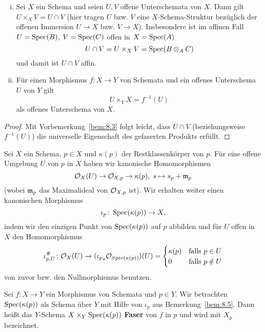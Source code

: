 \begin{bsp}
\label{bsp:8.4}
	\begin{enumerate}[i)]
		\item Sei $X$ ein Schema und seien $U,V$ offene Unterschemata von $X$. Dann gilt $U\times_X V = U \cap V$ (hier tragen $U$ bzw. $V$ eine $X$-Schema-Struktur bezüglich der offenen Immersion $U \to X$ bzw. $V\to X$). Insbesondere ist im affinen Fall $U = \operatorname{Spec}(B)$, $V=\operatorname{Spec}(C)$ offen in $X=\operatorname{Spec}(A)$
		\[
			U \cap V = U\times_X V = \operatorname{Spec}(B \otimes_A C) 	
		\]
		und damit ist $U \cap V$ affin.
		\item Für einen Morphismus $f \colon X \to Y$ von Schemata und ein offenes Unterschema $U$ von $Y$ gilt
		\[
			U \times_Y X = f^{-1}(U)
		\]
		als offenes Unterschema von $X$.
	\end{enumerate}
	\begin{proof}
		Mit Vorbemerkung~\ref{bem:8.3} folgt leicht, dass $U\cap V$ (beziehungsweise $f^{-1}(U)$) die universelle Eigenschaft des gefaserten Produkts erfüllt.
	\end{proof}
\end{bsp}

\begin{bem}
\label{bem:8.5}
	Sei $X$ ein Schema, $p \in X$ und $\kappa(p)$ der Restklassenkörper von $p$. Für eine offene Umgebung $U$ von $p$ in $X$ haben wir kanonische Homomorphismen
	\[
		\mathcal{O}_X(U) \to \mathcal{O}_{X,p} \to \kappa(p), \; s \mapsto s_p + \mathfrak{m}_p
	\]
	(wobei $\mathfrak{m}_p$ das Maximalideal von $\mathcal{O}_{X,p}$ ist).
	Wir erhalten weiter einen kanonischen Morphismus
	\[
		\iota_p\colon \operatorname{Spec}(\kappa(p))\to X,
	\]
	indem wir den einzigen Punkt von $\operatorname{Spec}(\kappa(p))$ auf $p$ abbilden und für $U$ offen in $X$ den Homomorphismus
	\[
		\iota_{p,U}^{\#} \colon \mathcal{O}_X(U)\to ({\iota_{p}}_*\mathcal{O}_{Spec(\kappa(p))})(U) = \begin{cases}\kappa(p) & \text{falls } p \in U\\0 & \text{falls } p \notin U\end{cases}
	\]
	von zuvor bzw. den Nullmorphismus benutzen.
\end{bem}

\begin{defn}
\label{defn:8.6}
	Sei $f\colon X \to Y$ ein Morphismus von Schemata und $p \in Y$. Wir betrachten $\operatorname{Spec}(\kappa(p))$ als Schema über $Y$ mit Hilfe von $\iota_p$ aus Bemerkung~\ref{bem:8.5}. Dann heißt das $Y$-Schema $X\times_Y\operatorname{Spec}(\kappa(p))$ \textbf{Faser} von $f$ in $p$ und wird mit $X_p$ bezeichnet.
	\begin{center}
	\end{center}
\end{defn}

